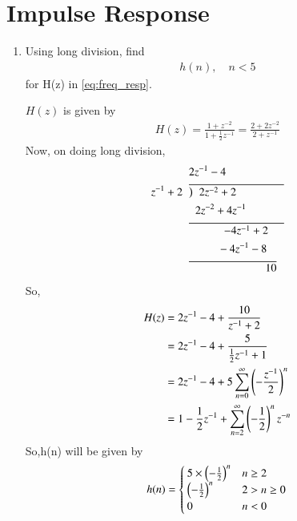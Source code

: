 \documentclass[journal,12pt,twocolumn]{IEEEtran}
\renewcommand\thesection{\arabic{section}}
\begin{document}
\section{Impulse Response}
\begin{enumerate}[label=\thesection.\arabic*]
	\item Using long division, 
	find
	\begin{align}
		h(n), \quad n < 5
	\end{align}
	for H(z) in 
	\eqref{eq:freq_resp}.


\solution $H(z)$ is given by
\begin{align}
	H(z)=\frac{1+z^{-2}}{1+\frac{1}{2}z^{-1}}=\frac{2+2z^{-2}}{2+z^{-1}}
\end{align}
Now, on doing long division,
\begin{align}
	&2z^{-1}-4    \nonumber\\	
  z^{-1}+2\hspace{2mm}&\overline{\big)\hspace{2mm} 2z^{-2}+2\hspace{15mm}}   \nonumber\\
	& \hspace{2mm} 2z^{-2}+4z^{-1}   \nonumber\\
	&\overline{\hspace{11mm}-4z^{-1}+2\hspace{5mm}}   \nonumber\\
	&\hspace{9mm}-4z^{-1}-8   \nonumber\\ 
	&\overline{\hspace{24mm}10}\nonumber
\end{align}
So,
\begin{align}
	H(z)&=2z^{-1}-4+\frac{10}{z^{-1}+2}\\
	&=2z^{-1}-4+\frac{5}{\frac{1}{2}z^{-1}+1}\\
	&=2z^{-1}-4+5\sum_{n=0}^\infty \left(-\frac{z^{-1}}{2}\right)^{n}\\
	&=1-\frac{1}{2}z^{-1}+\sum_{n=2}^\infty \left(-\frac{1}{2}\right)^{n}z^{-n}
\end{align}
So,h(n) will be given by 
\begin{align}
	h(n)=\begin{cases}
		\label{eq:h_n_def}
		5\times \left(-\frac{1}{2}\right)^n  & n\geq 2\\
		\left(-\frac{1}{2}\right)^n  &2>n\geq0\\
		0 &n<0
	\end{cases}
\end{align}

\end{enumerate}
\end{document}
